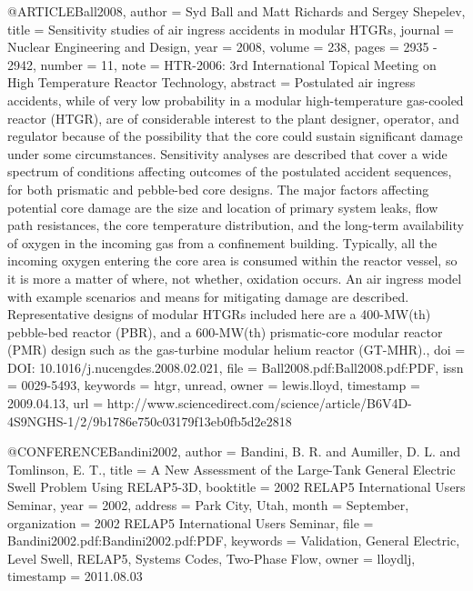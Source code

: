 @ARTICLE{Ball2008,
  author = {Syd Ball and Matt Richards and Sergey Shepelev},
  title = {Sensitivity studies of air ingress accidents in modular HTGRs},
  journal = {Nuclear Engineering and Design},
  year = {2008},
  volume = {238},
  pages = {2935 - 2942},
  number = {11},
  note = {HTR-2006: 3rd International Topical Meeting on High Temperature Reactor
	Technology},
  abstract = {Postulated air ingress accidents, while of very low probability in
	a modular high-temperature gas-cooled reactor (HTGR), are of considerable
	interest to the plant designer, operator, and regulator because of
	the possibility that the core could sustain significant damage under
	some circumstances. Sensitivity analyses are described that cover
	a wide spectrum of conditions affecting outcomes of the postulated
	accident sequences, for both prismatic and pebble-bed core designs.
	The major factors affecting potential core damage are the size and
	location of primary system leaks, flow path resistances, the core
	temperature distribution, and the long-term availability of oxygen
	in the incoming gas from a confinement building. Typically, all the
	incoming oxygen entering the core area is consumed within the reactor
	vessel, so it is more a matter of where, not whether, oxidation occurs.
	An air ingress model with example scenarios and means for mitigating
	damage are described. Representative designs of modular HTGRs included
	here are a 400-MW(th) pebble-bed reactor (PBR), and a 600-MW(th)
	prismatic-core modular reactor (PMR) design such as the gas-turbine
	modular helium reactor (GT-MHR).},
  doi = {DOI: 10.1016/j.nucengdes.2008.02.021},
  file = {Ball2008.pdf:Ball2008.pdf:PDF},
  issn = {0029-5493},
  keywords = {htgr, unread},
  owner = {lewis.lloyd},
  timestamp = {2009.04.13},
  url = {http://www.sciencedirect.com/science/article/B6V4D-4S9NGHS-1/2/9b1786e750c03179f13eb0fb5d2e2818}
}

@CONFERENCE{Bandini2002,
  author = {Bandini, B. R. and Aumiller, D. L. and Tomlinson, E. T.},
  title = {A New Assessment of the Large-Tank General Electric Swell Problem
	Using RELAP5-3D},
  booktitle = {2002 RELAP5 International Users Seminar},
  year = {2002},
  address = {Park City, Utah},
  month = {September},
  organization = {2002 RELAP5 International Users Seminar},
  file = {Bandini2002.pdf:Bandini2002.pdf:PDF},
  keywords = {Validation, General Electric, Level Swell, RELAP5, Systems Codes,
	Two-Phase Flow},
  owner = {lloydlj},
  timestamp = {2011.08.03}
}


